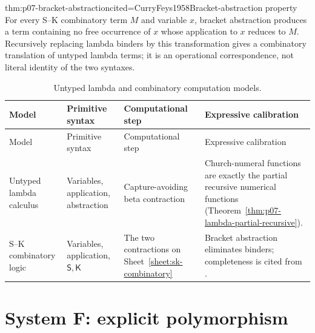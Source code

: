 \begin{hbtheorem}{thm:p07-bracket-abstraction}{cited=CurryFeys1958}{Bracket-abstraction property}
For every S--K combinatory term \(M\) and variable \(x\), bracket abstraction
produces a term containing no free occurrence of \(x\) whose application to
\(x\) reduces to \(M\).  Recursively replacing lambda binders by this
transformation gives a combinatory translation of untyped lambda terms; it is
an operational correspondence, not literal identity of the two syntaxes.
\end{hbtheorem}

\begingroup\small
\begin{longtable}{@{}p{}p{}p{}p{}@{}}
\caption{Untyped lambda and combinatory computation models.}
\label{tab:p07-untyped-computation-models}\\
\toprule
Model & Primitive syntax & Computational step & Expressive calibration \\
\midrule
\endfirsthead
\toprule
Model & Primitive syntax & Computational step & Expressive calibration \\
\midrule
\endhead
Untyped lambda calculus & Variables, application, abstraction &
Capture-avoiding beta contraction & Church-numeral functions are exactly the
partial recursive numerical functions
(Theorem~\ref{thm:p07-lambda-partial-recursive}). \\
S--K combinatory logic & Variables, application, \(\mathsf S,\mathsf K\) &
The two contractions on Sheet~\ref{sheet:sk-combinatory} & Bracket
abstraction eliminates binders; completeness is cited from
\cite{CurryFeys1958}. \\
\bottomrule
\end{longtable}
\endgroup

\section{System F: explicit polymorphism}

